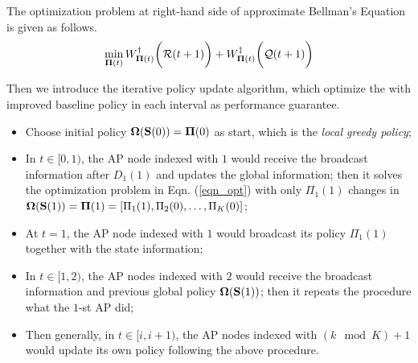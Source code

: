 The optimization problem at right-hand side of approximate Bellman's Equation is given as follows.
\begin{align}
    \min_{\boldsymbol{\Pi}({t})} W^{\dagger}_{\boldsymbol{\Pi}({t})}\bigg(\mathcal{R}({t+1})\bigg) + W^{\ddagger}_{\boldsymbol{\Pi}({t})}\bigg(\mathcal{Q}({t+1})\bigg)
    \label{eqn_opt}
\end{align}

Then we introduce the iterative policy update algorithm, which optimize the 
with improved baseline policy in each interval as performance guarantee.
\begin{itemize}
    \item Choose initial policy $\boldsymbol{\Omega}(\mathbf{S}(0)) = \boldsymbol{\Pi}(0)$ as start, which is the \emph{local greedy policy};
    \item In $t\in[0, 1)$, the AP node indexed with $1$ would receive the broadcast information after $D_1(1)$ and updates the global information; then it solves the optimization problem in Eqn. (\ref{eqn_opt}) with only $\Pi_{1}(1)$ changes in $\boldsymbol{\Omega}(\mathbf{S}(1)) = \boldsymbol{\Pi}(1) = [\Pi_{1}(1), \Pi_{2}(0), \dots, \Pi_{K}(0)]$;
    \item At $t=1$, the AP node indexed with $1$ would broadcast its policy $\Pi_{1}(1)$ together with the state information;
    \item In $t\in[1, 2)$, the AP nodes indexed with $2$ would receive the broadcast information and previous global policy $\boldsymbol{\Omega}(\mathbf{S}(1))$; then it repeats the procedure what the $1$-st AP did;
    \item Then generally, in $t\in[{i}, {i+1})$, the AP nodes indexed with $(k \mod K)+1$ would update its own policy following the above procedure.
\end{itemize}

